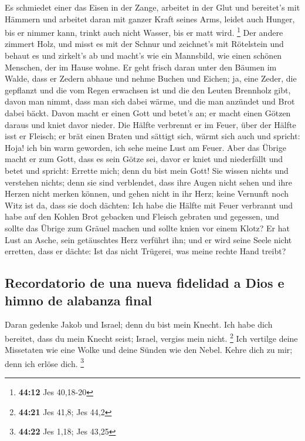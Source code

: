  Es schmiedet einer das Eisen in der Zange, arbeitet in
der Glut und bereitet's mit Hämmern und arbeitet daran mit ganzer Kraft
seines Arms, leidet auch Hunger, bis er nimmer kann, trinkt auch nicht
Wasser, bis er matt wird. \footnote{\textbf{44:12} Jes 40,18-20}
 Der andere zimmert Holz, und misst es mit der Schnur und
zeichnet's mit Rötelstein und behaut es und zirkelt's ab und macht's wie
ein Mannsbild, wie einen schönen Menschen, der im Hause wohne.
 Er geht frisch daran unter den Bäumen im Walde, dass er
Zedern abhaue und nehme Buchen und Eichen; ja, eine Zeder, die gepflanzt
und die vom Regen erwachsen ist  und die den Leuten
Brennholz gibt, davon man nimmt, dass man sich dabei wärme, und die man
anzündet und Brot dabei bäckt. Davon macht er einen Gott und betet's an;
er macht einen Götzen daraus und kniet davor nieder.  Die
Hälfte verbrennt er im Feuer, über der Hälfte isst er Fleisch; er brät
einen Braten und sättigt sich, wärmt sich auch und spricht: Hoja! ich
bin warm geworden, ich sehe meine Lust am Feuer.  Aber
das Übrige macht er zum Gott, dass es sein Götze sei, davor er kniet und
niederfällt und betet und spricht: Errette mich; denn du bist mein Gott!
 Sie wissen nichts und verstehen nichts; denn sie sind
verblendet, dass ihre Augen nicht sehen und ihre Herzen nicht merken
können,  und gehen nicht in ihr Herz; keine Vernunft noch
Witz ist da, dass sie doch dächten: Ich habe die Hälfte mit Feuer
verbrannt und habe auf den Kohlen Brot gebacken und Fleisch gebraten und
gegessen, und sollte das Übrige zum Gräuel machen und sollte knien vor
einem Klotz?  Er hat Lust an Asche, sein getäuschtes Herz
verführt ihn; und er wird seine Seele nicht erretten, dass er dächte:
Ist das nicht Trügerei, was meine rechte Hand treibt?

\hypertarget{recordatorio-de-una-nueva-fidelidad-a-dios-e-himno-de-alabanza-final}{%
\subsection{Recordatorio de una nueva fidelidad a Dios e himno de
alabanza
final}\label{recordatorio-de-una-nueva-fidelidad-a-dios-e-himno-de-alabanza-final}}

 Daran gedenke Jakob und Israel; denn du bist mein
Knecht. Ich habe dich bereitet, dass du mein Knecht seist; Israel,
vergiss mein nicht. \footnote{\textbf{44:21} Jes 41,8; Jes 44,2}
 Ich vertilge deine Missetaten wie eine Wolke und deine
Sünden wie den Nebel. Kehre dich zu mir; denn ich erlöse dich.
\footnote{\textbf{44:22} Jes 1,18; Jes 43,25}

